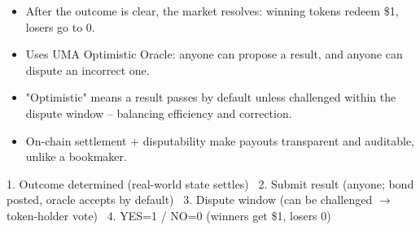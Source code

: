 \begin{frame}[t]
\par{}
\begin{pmbody}
\begin{itemize}\pmspreaditems
  \item After the outcome is clear, the market resolves: winning tokens redeem \$1, losers go to 0.
  \item Uses UMA Optimistic Oracle: anyone can propose a result, and anyone can dispute an incorrect one.
  \item "Optimistic" means a result passes by default unless challenged within the dispute window -- balancing efficiency and correction.
  \item On-chain settlement + disputability make payouts transparent and auditable, unlike a bookmaker.
\end{itemize}
\begin{pmcallout}
  1. Outcome determined (real-world state settles) \arr\ 2. Submit result (anyone; bond posted, oracle accepts by default) \arr\ 3. Dispute window (can be challenged $\to$ token-holder vote) \arr\ 4. YES=1 / NO=0 (winners get \$1, losers 0)
\end{pmcallout}
\end{pmbody}
\end{frame}
